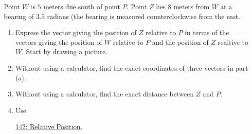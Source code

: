 \documentclass{ximera}
\begin{document}
\begin{question}  \label{Q9dfrwDSFD}
Point $W$ is $5$ meters due south of point $P$. Point $Z$ lies $8$ meters from $W$ at a bearing of $3.5$ radians (the bearing is measured counterclockwise from the east.

\begin{enumerate}
\item Express the vector giving the position of $Z$ relative to $P$ in terms of the vectors giving the position of $W$ relative to $P$ and the position of $Z$ realtive to $W$. Start by drawing a picture.

\item Without using a calculator, find the exact coordinates of three vectors in part (a).

\item Without using a calculator, find the exact distance between $Z$ and $P$.

\item Use  

\href{https://www.geogebra.org/classic/bhdsgxtx}{142: Relative Position}.

 
\begin{onlineOnly}
    \begin{center}
\end{center}
\end{onlineOnly}
\end{enumerate}
\end{question}
\end{document}
